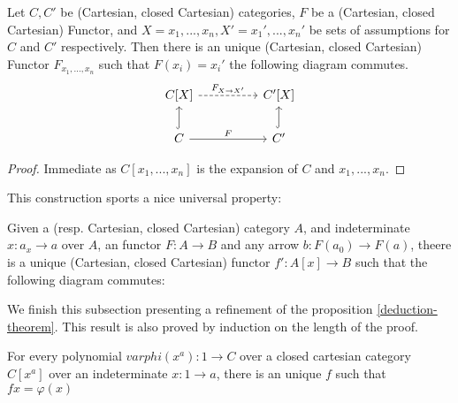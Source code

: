 \begin{proposition}\label{unique-polynomial-functor}Let $C,C'$ be (Cartesian, closed Cartesian) categories, $F$ be a (Cartesian, closed Cartesian) Functor, and $X={x_1,...,x_n}, X'={x_1',...,x_n'}$ be sets of assumptions for $C$ and $C'$ respectively. Then there is an unique (Cartesian, closed Cartesian) Functor $F_{x_1,...,x_n}$ such that $F(x_i)=x_i'$ the following diagram commutes. 
  \[
    \begin{tikzcd}
      C[X]\arrow[dashed]{rr}{F_{X\to X'}}&& C'[X]\\
      C \arrow{rr}{F}\arrow[hookrightarrow]{u}{}&& C'\arrow[hookrightarrow]{u}{}
    \end{tikzcd}
  \]
\end{proposition}
\begin{proof}
Immediate as $C[x_1,...,x_n]$ is the expansion of $C$ and ${x_1,...,x_n}$.
\end{proof}

This construction sports a nice universal property:

\begin{proposition}
  Given a (resp. Cartesian, closed Cartesian) category $A$, and indeterminate $x:a_x\to a$ over $A$, an functor $F:A\to B$ and any arrow $ b:F(a_0) \to F(a)$, theere is a unique (Cartesian, closed Cartesian) functor $f': A[x]\to B$ such that the following diagram commutes:
  
\end{proposition}

We finish this subsection presenting a refinement of the proposition \ref{deduction-theorem}. This result is also proved by induction on the length of the proof.

\begin{proposition}
For every polynomial $varphi(x^a): 1\to C$ over a closed cartesian category $C[x^a]$ over an indeterminate $x:1\to a$, there is an unique $f$ such that $fx=\varphi(x)$
\end{proposition}
